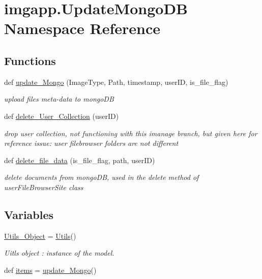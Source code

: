 \hypertarget{namespaceimgapp_1_1UpdateMongoDB}{}\section{imgapp.\+Update\+Mongo\+DB Namespace Reference}
\label{namespaceimgapp_1_1UpdateMongoDB}
\subsection*{Functions}
\begin{DoxyCompactItemize}
\item 
def \hyperlink{namespaceimgapp_1_1UpdateMongoDB_a5bc486192c38922a65cc60e598bc9b1e}{update\+\_\+\+Mongo} (Image\+Type, Path, timestamp, user\+ID, is\+\_\+file\+\_\+flag)
\begin{DoxyCompactList}\small\item\em upload file\textquotesingle{}s meta-\/data to mongo\+DB \end{DoxyCompactList}\item 
def \hyperlink{namespaceimgapp_1_1UpdateMongoDB_aa239083b46ac5a0d725fa61e8068553b}{delete\+\_\+\+User\+\_\+\+Collection} (user\+ID)
\begin{DoxyCompactList}\small\item\em drop user collection, not functioning with this imanage branch, but given here for reference issue\+: user filebrowser folders are not different \end{DoxyCompactList}\item 
def \hyperlink{namespaceimgapp_1_1UpdateMongoDB_ac48df6f990520cda63813e27faa06095}{delete\+\_\+file\+\_\+data} (is\+\_\+file\+\_\+flag, path, user\+ID)
\begin{DoxyCompactList}\small\item\em delete documents from mongo\+DB, used in the delete method of user\+File\+Browser\+Site class \end{DoxyCompactList}\end{DoxyCompactItemize}
\subsection*{Variables}
\begin{DoxyCompactItemize}
\item 
\hyperlink{namespaceimgapp_1_1UpdateMongoDB_a5b8548ed7b19bb6f553a7c052c778406}{Utils\+\_\+\+Object} = \hyperlink{classimgapp_1_1utils_1_1Utils}{Utils}()
\begin{DoxyCompactList}\small\item\em Uitls object \+: instance of the model. \end{DoxyCompactList}\item 
def \hyperlink{namespaceimgapp_1_1UpdateMongoDB_ae23d58bb055998ec921a4a52cdc001f9}{items} = \hyperlink{namespaceimgapp_1_1UpdateMongoDB_a5bc486192c38922a65cc60e598bc9b1e}{update\+\_\+\+Mongo}(\textquotesingle{}\textquotesingle{})
\end{DoxyCompactItemize}


